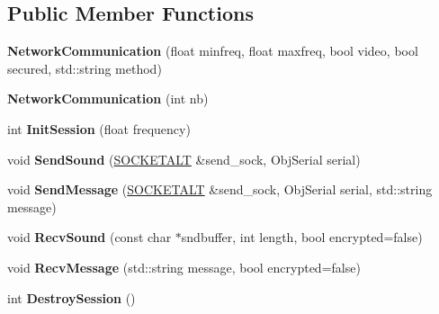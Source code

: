 \subsection*{Public Member Functions}
\begin{DoxyCompactItemize}
\item 
{\bfseries Network\+Communication} (float minfreq, float maxfreq, bool video, bool secured, std\+::string method)\hypertarget{classNetworkCommunication_a33b79c17eef42e2b46325fce7ceaf6db}{}\label{classNetworkCommunication_a33b79c17eef42e2b46325fce7ceaf6db}

\item 
{\bfseries Network\+Communication} (int nb)\hypertarget{classNetworkCommunication_a667f6f35b8d899751d513cb75800d33b}{}\label{classNetworkCommunication_a667f6f35b8d899751d513cb75800d33b}

\item 
int {\bfseries Init\+Session} (float frequency)\hypertarget{classNetworkCommunication_a2516ae99b299b327cfbd404dbb9af2d7}{}\label{classNetworkCommunication_a2516ae99b299b327cfbd404dbb9af2d7}

\item 
void {\bfseries Send\+Sound} (\hyperlink{classSOCKETALT}{S\+O\+C\+K\+E\+T\+A\+LT} \&send\+\_\+sock, Obj\+Serial serial)\hypertarget{classNetworkCommunication_a1c080047650f8969041a59f4f655ddc9}{}\label{classNetworkCommunication_a1c080047650f8969041a59f4f655ddc9}

\item 
void {\bfseries Send\+Message} (\hyperlink{classSOCKETALT}{S\+O\+C\+K\+E\+T\+A\+LT} \&send\+\_\+sock, Obj\+Serial serial, std\+::string message)\hypertarget{classNetworkCommunication_ad09c333cb24544c435ce7bc1c169fd9c}{}\label{classNetworkCommunication_ad09c333cb24544c435ce7bc1c169fd9c}

\item 
void {\bfseries Recv\+Sound} (const char $\ast$sndbuffer, int length, bool encrypted=false)\hypertarget{classNetworkCommunication_a9ae81ab509a2f858e0cc983855d99fd5}{}\label{classNetworkCommunication_a9ae81ab509a2f858e0cc983855d99fd5}

\item 
void {\bfseries Recv\+Message} (std\+::string message, bool encrypted=false)\hypertarget{classNetworkCommunication_a2cd92362cee7b4ce93409f45ca7df39e}{}\label{classNetworkCommunication_a2cd92362cee7b4ce93409f45ca7df39e}

\item 
int {\bfseries Destroy\+Session} ()\hypertarget{classNetworkCommunication_a3a42623fd33ce0c0f6663dcd65592e77}{}\label{classNetworkCommunication_a3a42623fd33ce0c0f6663dcd65592e77}


\end{DoxyCompactItemize}
